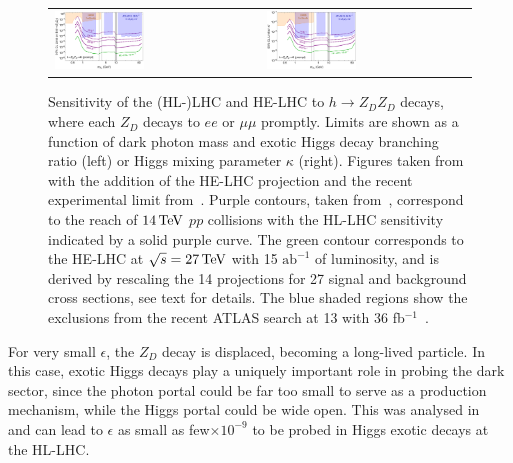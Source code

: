 \begin{figure}
\begin{tabular}{m{} m{}}
\includegraphics[width=0.45\textwidth]{section9/plots/FORPAPER_HiggsMixingLimitsBrHZdZd_14_27_TeV}
&
\includegraphics[width=0.45\textwidth]{section9/plots/FORPAPER_HiggsMixingLimitskappaprime_14_27_TeV}
\end{tabular}
\caption{
Sensitivity of the (HL-)LHC and HE-LHC to  $h \to Z_D Z_D$ decays, where each $Z_D$ decays to $ee$ or $\mu \mu$ promptly. Limits are shown as a function of dark photon mass and exotic Higgs decay branching ratio (left) or Higgs mixing parameter $\kappa$ (right). 
%
Figures taken from~\cite{Curtin:2014cca} with the addition of the HE-LHC projection and the recent experimental limit from~\cite{Aaboud:2018fvk}.
%
 Purple contours, taken from~\cite{Curtin:2014cca}, correspond to the reach of $14 \,\text{Te\hspace{-.08em}V}$ $pp$ collisions with the HL-LHC sensitivity indicated by a solid purple curve. The green contour corresponds to the HE-LHC at $\sqrt{s} = 27 \,\text{Te\hspace{-.08em}V}$ with 15 $\mathrm{ab}^{-1}$ of luminosity, and is derived by rescaling the 14 \UTeV projections for 27 \UTeV signal and background cross sections, see text for details. The blue shaded regions show the exclusions from the recent ATLAS search at 13 \UTeV with 36 fb$^{-1}$~\cite{Aaboud:2018fvk}.
}
\label{f.darkphotonZDZDprompt}
\end{figure}



For very small $\epsilon$, the $Z_D$ decay is displaced, becoming a long-lived particle. In this case, exotic Higgs decays play a uniquely important role in probing the dark sector, since the photon portal could be far too small to serve as a production mechanism, while the Higgs portal could be wide open. 
%
This was analysed in~\cite{Curtin:2014cca,Curtin:2018mvb} and can lead to $\epsilon$ as small as few$\times 10^{-9}$ to be probed in Higgs exotic decays at the HL-LHC. 



